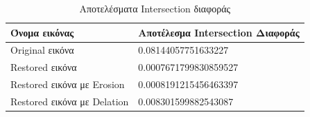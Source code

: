 \begin{table}[H]
  \centering
	\begin{tabular}{ | p{8cm} | p{8cm} | }
		\hline
		\textbf{Όνομα εικόνας} & \textbf{Αποτέλεσμα Intersection Διαφοράς} \\
    \hline
    Original εικόνα & 0.08144057751633227 \\
    \hline
    Restored εικόνα & 0.0007671799830859527 \\
    \hline
    Restored εικόνα με Erosion & 0.0008191215456463397 \\
    \hline
    Restored εικόνα με Delation & 0.008301599882543087 \\
    \hline
	\end{tabular}
  \caption{Αποτελέσματα Intersection διαφοράς}
  \label{tab:intersection}
\end{table}
